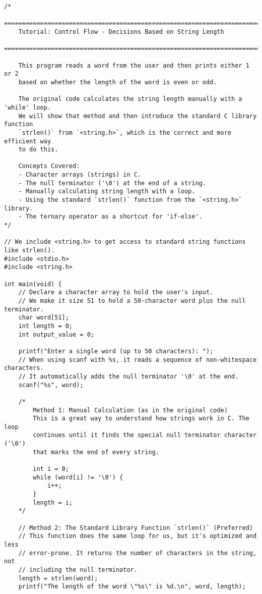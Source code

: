 \documentclass[11pt]{book}
\begin{document}
\begin{verbatim}
/*
    ================================================================================
    Tutorial: Control Flow - Decisions Based on String Length
    ================================================================================

    This program reads a word from the user and then prints either 1 or 2
    based on whether the length of the word is even or odd.

    The original code calculates the string length manually with a 'while' loop.
    We will show that method and then introduce the standard C library function
    `strlen()` from `<string.h>`, which is the correct and more efficient way
    to do this.

    Concepts Covered:
    - Character arrays (strings) in C.
    - The null terminator ('\0') at the end of a string.
    - Manually calculating string length with a loop.
    - Using the standard `strlen()` function from the `<string.h>` library.
    - The ternary operator as a shortcut for 'if-else'.
*/

// We include <string.h> to get access to standard string functions like strlen().
#include <stdio.h>
#include <string.h>

int main(void) {
    // Declare a character array to hold the user's input.
    // We make it size 51 to hold a 50-character word plus the null terminator.
    char word[51];
    int length = 0;
    int output_value = 0;

    printf("Enter a single word (up to 50 characters): ");
    // When using scanf with %s, it reads a sequence of non-whitespace characters.
    // It automatically adds the null terminator '\0' at the end.
    scanf("%s", word);

    /*
        Method 1: Manual Calculation (as in the original code)
        This is a great way to understand how strings work in C. The loop
        continues until it finds the special null terminator character ('\0')
        that marks the end of every string.

        int i = 0;
        while (word[i] != '\0') {
            i++;
        }
        length = i;
    */

    // Method 2: The Standard Library Function `strlen()` (Preferred)
    // This function does the same loop for us, but it's optimized and less
    // error-prone. It returns the number of characters in the string, not
    // including the null terminator.
    length = strlen(word);
    printf("The length of the word \"%s\" is %d.\n", word, length);


\end{verbatim}
\end{document}
